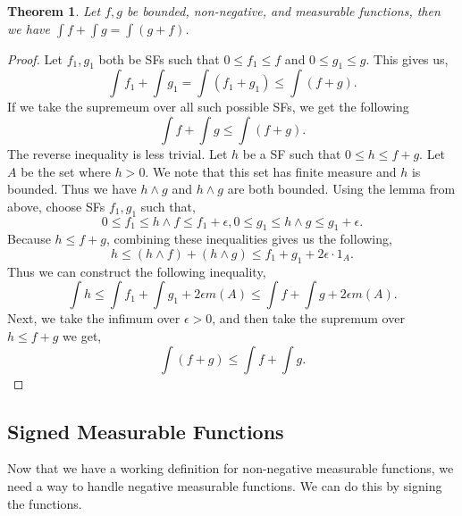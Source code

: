 \documentclass{article}
\newtheorem{theorem}{Theorem}
\theoremstyle{axiom} \newtheorem{axiom}{Axiom}
\theoremstyle{definition} \newtheorem{definition}{Definition}
\theoremstyle{example} \newtheorem{example}{Example}
\theoremstyle{proposition} \newtheorem{prop}{Proposition}
\theoremstyle{lemma} \newtheorem{lemma}{Lemma}
\begin{document}
\begin{theorem}
	Let $f,g$ be bounded, non-negative, and measurable functions, then we have 
	$\int f + \int g = \int (g+f)$.
\end{theorem}
\begin{proof}
	Let $f_1,g_1$ both be SFs such that $0 \leq f_1 \leq f$ and 
	$0 \leq g_1 \leq g$. This gives us,
	\begin{equation*}
		\int f_1 + \int g_1 = \int (f_1 + g_1) \leq \int (f+g).
	\end{equation*}
	If we take the supremeum over all such possible SFs, we get the following
	\begin{equation*}
		\int f + \int g \leq \int (f+g).
	\end{equation*}
	The reverse inequality is less trivial. Let $h$ be a SF such that 
	$0\leq h \leq f+g$. Let $A$ be the set where $h >0$. We note that this
	set has finite measure and $h$ is bounded. Thus we have $h\land g$ and $h\land g$
	are both bounded. Using the lemma from above, choose SFs $f_1, g_1$ such 
	that,
	\begin{equation*}
		0 \leq f_1 \leq h \land f \leq f_1 +\epsilon, 
		0 \leq g_1 \leq h\land g \leq g_1+ \epsilon.
	\end{equation*}
	Because $h \leq f+g$, combining these inequalities gives us the following,
	\begin{equation*}
		h \leq (h \land f) + (h\land g) \leq f_1 + g_1+ 2\epsilon\cdot 1_A.
	\end{equation*}
	Thus we can construct the following inequality,
	\begin{equation*}
		\int h \leq \int f_1 + \int g_1 + 2\epsilon m(A) \leq \int f + \int g +
		2\epsilon m(A).
	\end{equation*}
	Next, we take the infimum over $\epsilon > 0$, and then take the supremum 
	over $h \leq f+g$ we get,
	\begin{equation*}
		\int (f+g) \leq \int f + \int g.
	\end{equation*}
\end{proof}

\subsection{Signed Measurable Functions}

Now that we have a working definition for non-negative measurable functions, we
need a way to handle negative measurable functions. We can do this by signing
the functions.
\end{document}
